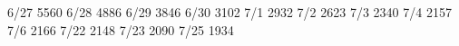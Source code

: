 6/27	5560
6/28	4886
6/29	3846
6/30	3102
7/1	2932
7/2	2623
7/3	2340
7/4  2157
7/6  2166
7/22 2148
7/23 2090
7/25 1934